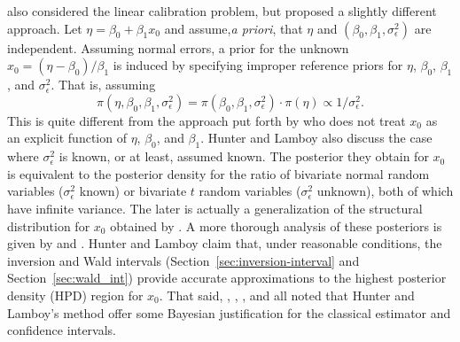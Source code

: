 \documentclass[cmfont,usenames,dvipsnames,leqno]{afit-etd}\usepackage[]{graphicx}\usepackage[]{color}
\begin{document}
\citet{hunter_bayesian_1981} also considered the linear calibration problem, but proposed a slightly different approach. Let $\eta = \beta_0 + \beta_1 x_0$ and assume,\textit{a priori}, that $\eta$ and $(\beta_0, \beta_1, \sigma_\epsilon^2)$ are independent. Assuming normal errors, a prior for the unknown $x_0 = (\eta - \beta_0)/\beta_1$ is induced by specifying improper reference priors for $\eta$, $\beta_0$, $\beta_1$, and $\sigma_\epsilon^2$. That is, assuming 
\begin{equation*}
  \pi\left(\eta, \beta_0, \beta_1, \sigma_\epsilon^2\right) = \pi\left(\beta_0, \beta_1, \sigma_\epsilon^2\right) \cdot \pi\left(\eta\right) \propto 1/\sigma_\epsilon^2. 
\end{equation*}
This is quite different from the approach put forth by \citet{hoadley_bayesian_1970} who does not treat $x_0$ as an explicit function of $\eta$, $\beta_0$, and $\beta_1$. Hunter and Lamboy also discuss the case where $\sigma_\epsilon^2$ is known, or at least, assumed known. The posterior they obtain for $x_0$ is equivalent to the posterior density for the ratio of bivariate normal random variables ($\sigma_\epsilon^2$ known) or bivariate $t$ random variables ($\sigma_\epsilon^2$ unknown), both of which have infinite variance. The later is actually a generalization of the structural distribution for $x_0$ obtained by \citet{kalotay_structural_1971}. A more thorough analysis of these posteriors is given by \citet{hunter_bayesian_1979} and \citet{hunter_making_1979}. Hunter and Lamboy claim that, under reasonable conditions, the inversion and Wald intervals (Section~\ref{sec:inversion-interval} and Section~\ref{sec:wald_int}) provide accurate approximations to the highest posterior density (HPD) region for $x_0$. That said, \citet{hill_discussion_1981}, \citet{orban_discussion_1981}, \citet{lwin_discussion_1981}, and \citet{brown_multivariate_1982} all noted that Hunter and Lamboy's method offer some Bayesian justification for the classical estimator and confidence intervals. 
\end{document}
